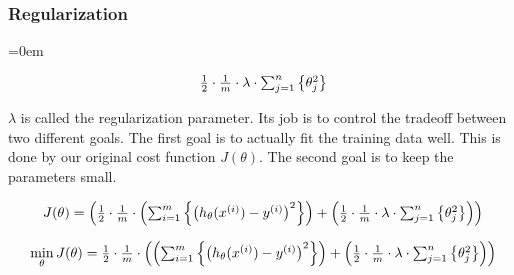 \pagebreak
\subsubsectionend
\subsubsection{Regularization}
\label{sssec:regularization}
\parindent=0em


\[
	\begin{array}{ l@{} l@{} } 
		\frac{1}{2} \cdot
		\frac{1}{m} \cdot 
		\lambda \cdot
		\sum_{j = 1}^{n}
		\left\{
			{\theta_{j}^{2}}
		\right\} 
	\end{array}
\]

$\lambda$ is called the regularization parameter. Its job is to control the
tradeoff between two different goals. The first goal is to actually fit the
training data well. This is done by our original cost function $J(\theta)$. The
second goal is to keep the parameters small. 

\[
	\begin{array}{ l@{} l@{} } 
		J(\theta)
		=
		\left( 
		\frac{1}{2}
		\cdot
		\frac{1}{m}
		\cdot 
			\left(
				\sum_{i=1}^m
				\left\{
					\left(
						h_\theta(x^{(i)}) - y^{(i)}
					\right)^{2}
				\right\}
			\right) 
			+
			\left( 
				\frac{1}{2} \cdot
				\frac{1}{m} \cdot 
				\lambda \cdot
				\sum_{j = 1}^{n}
				\left\{
					{\theta_{j}^{2}}
				\right\}
			\right)
		\right) 
	\end{array} 
\]

\[
	\begin{array}{ l@{} l@{} } 
		\min\limits_\theta
		J(\theta)
		=
		\frac{1}{2}
		\cdot
		\frac{1}{m}
		\cdot
		\left(
			\left(
				\sum_{i=1}^m
				\left\{
					\left(
						h_\theta(x^{(i)}) - y^{(i)}
					\right)^{2}
				\right\}
			\right) 
			+
			\left( 
				\frac{1}{2} \cdot
				\frac{1}{m} \cdot
				\lambda \cdot
				\sum_{j = 1}^{n}
				\left\{
					{\theta_{j}^{2}}
				\right\}
			\right)
		\right) 
	\end{array} 
\]


\subsubsectionend

\pagebreak
\subsectionend

